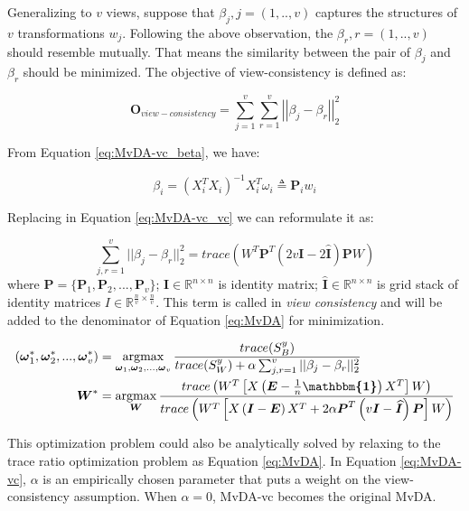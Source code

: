         Generalizing to $v$ views, suppose that ${\beta}_j, j=(1,..,v)$ captures the structures of $v$ transformations ${w}_j$.
        Following the above observation, the $\beta_r, r=(1,..,v)$ should resemble mutually.
        That means the similarity between the pair of $\beta_j$ and $\beta_r$ should be minimized.
        The objective of view-consistency is defined as:

        \begin{equation}
            \boldsymbol{O}_{view-consistency} = \sum_{j=1}^{v}\sum_{r=1}^{v}\left|\left|\beta_j - \beta_r\right|\right|_2^2
            \label{eq:MvDA-vc_vc}
        \end{equation}

        From Equation \eqref{eq:MvDA-vc_beta}, we have:

        \begin{equation}
            \beta_i = {\left(X_i^{T}X_i\right)}^{-1}X_i^{T}\omega_i \triangleq \boldsymbol{P}_iw_i
        \end{equation}

        Replacing in Equation \eqref{eq:MvDA-vc_vc} we can reformulate it as:

        \begin{equation}
            \sum_{j,r=1}^{v}||\beta_j - \beta_r||_2^2 = trace\left(W^{T}\boldsymbol{P}^{T}\left(2v\boldsymbol{I} - 2\boldsymbol{\widehat{I}}\right)\boldsymbol{P}W\right)
        \end{equation}
        where $\boldsymbol{P} = \{\boldsymbol{P}_1,\boldsymbol{P}_2,...,\boldsymbol{P}_v\}$; $\boldsymbol{I} \in \mathbb{R}^{n\times n}$ is identity matrix; $\boldsymbol{\widehat{I}} \in \mathbb{R}^{n\times n}$ is grid stack of identity matrices $I \in \mathbb{R}^{\frac{n}{v}\times\frac{n}{v}}$.
        This term is called in \cite{kan2016multi} {\itshape view consistency} and will be added to the denominator of Equation \eqref{eq:MvDA} for minimization.

        \begin{align}
            (\boldsymbol{\omega}_1^*,\boldsymbol{\omega}_2^*, ..., \boldsymbol{\omega}_v^*) &= \operatorname*{argmax}_{\boldsymbol{\omega}_1, \boldsymbol{\omega}_2,..., \boldsymbol{\omega}_v}\frac{trace({S}_B^y)}{trace({S}_W^y) + \alpha\sum_{j,r=1}^{v}||\beta_j - \beta_r||_2^2}\\
            \boldsymbol{W}^* &= \operatorname*{argmax}_{\boldsymbol{W}}\frac{trace\left(W^{T}\left[X\left(\boldsymbol{E} - \frac{1}{n}\boldsymbol{\mathbbm{1}}\right)X^{T}\right]W\right)}{trace\left(W^{T}\left[X\left(\boldsymbol{I} - \boldsymbol{E}\right)X^{T} + 2\alpha\boldsymbol{P}^T\left(v\boldsymbol{I} - \boldsymbol{\widehat{I}}\right)\boldsymbol{P}\right]W\right)}
            \label{eq:MvDA-vc}
        \end{align}

        This optimization problem could also be analytically solved by relaxing to the trace ratio optimization problem as Equation \eqref{eq:MvDA}.
        In Equation \eqref{eq:MvDA-vc}, $\alpha$ is an empirically chosen parameter that puts a weight on the view-consistency assumption.
        When $\alpha = 0$, MvDA-vc becomes the original MvDA. 
